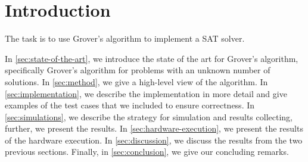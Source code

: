 \section{Introduction}

The task is to use Grover's algorithm to implement a SAT solver.

In \autoref{sec:state-of-the-art}, we introduce the state of the art for Grover's algorithm, specifically Grover's algorithm for problems with an unknown number of solutions.
In \autoref{sec:method}, we give a high-level view of the algorithm.
In \autoref{sec:implementation}, we describe the implementation in more detail and give examples of the test cases that we included to ensure correctness.
In \autoref{sec:simulations}, we describe the strategy for simulation and results collecting, further, we present the results.
In \autoref{sec:hardware-execution}, we present the results of the hardware execution.
In \autoref{sec:discussion}, we discuss the results from the two previous sections.
Finally, in \autoref{sec:conclusion}, we give our concluding remarks.

